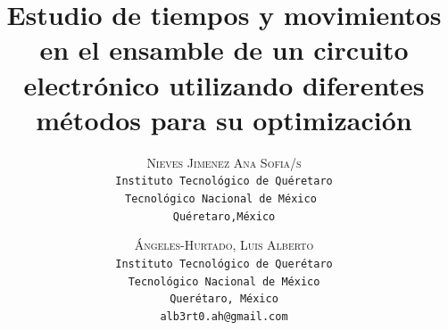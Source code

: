     \lfoot{ \thepage}
    
    \setlength{\droptitle}{-5\baselineskip} %
    \title{\textbf{Estudio de tiempos y movimientos en el ensamble de un circuito electrónico utilizando diferentes métodos para su optimización }} %
    
     \author{ 
     \textsc{Nieves Jimenez Ana Sofia/s}\\ 
     \texttt{ Instituto Tecnológico de Quéretaro } \\ 
     \texttt{Tecnológico Nacional de México } \\ 
     \texttt{Quéretaro,México}\\ 
     \texttt{} 
     \and 
     \textsc{Ángeles-Hurtado, Luis Alberto}\\ 
     \texttt{ Instituto Tecnológico de Querétaro } \\ 
     \texttt{ Tecnológico Nacional de México } \\ 
     \texttt{Querétaro, México}\\ 
     \texttt{alb3rt0.ah@gmail.com} 
    }
    
    
    
    
    \maketitle
    \thispagestyle{fancy}
    
